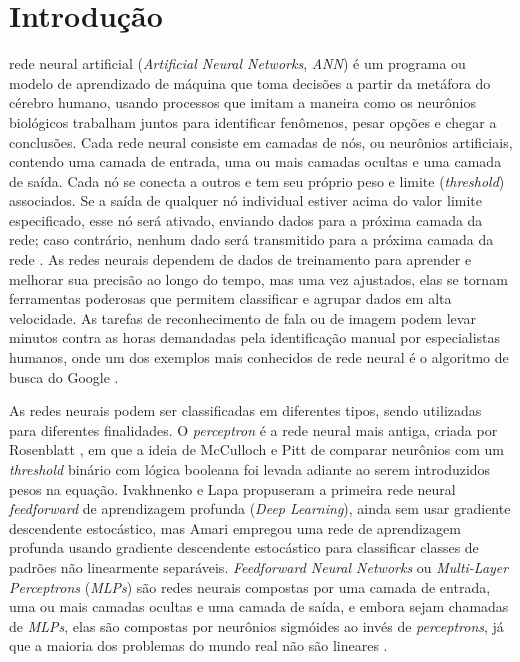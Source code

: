 \documentclass[journal]{IEEEtran}
\begin{document}
%
\IEEEpeerreviewmaketitle



\section{Introdução}
 rede neural artificial (\textit{Artificial Neural Networks}, \textit{ANN}) é um programa ou modelo de aprendizado de máquina que toma decisões a partir da metáfora do cérebro humano, usando processos que imitam a maneira como os neurônios biológicos trabalham juntos para identificar fenômenos, pesar opções e chegar a conclusões. Cada rede neural consiste em camadas de nós, ou neurônios artificiais, contendo uma camada de entrada, uma ou mais camadas ocultas e uma camada de saída. Cada nó se conecta a outros e tem seu próprio peso e limite (\textit{threshold}) associados. Se a saída de qualquer nó individual estiver acima do valor limite especificado, esse nó será ativado, enviando dados para a próxima camada da rede; caso contrário, nenhum dado será transmitido para a próxima camada da rede \cite{ibm}.
As redes neurais dependem de dados de treinamento para aprender e melhorar sua precisão ao longo do tempo, mas uma vez ajustados, elas se tornam ferramentas poderosas que permitem classificar e agrupar dados em alta velocidade. As tarefas de reconhecimento de fala ou de imagem podem levar minutos contra as horas demandadas pela identificação manual por especialistas humanos, onde um dos exemplos mais conhecidos de rede neural é o algoritmo de busca do Google \cite{ibm}.

As redes neurais podem ser classificadas em diferentes tipos, sendo utilizadas para diferentes finalidades. O \textit{perceptron} é a rede neural mais antiga, criada por Rosenblatt \cite{rosenblatt}, em que a ideia de McCulloch e Pitt \cite{mcculloch} de comparar neurônios com um \textit{threshold} binário com lógica booleana foi levada adiante ao serem introduzidos pesos na equação. Ivakhnenko e Lapa \cite{ivakhnenko} propuseram a primeira rede neural \textit{feedforward} de aprendizagem profunda (\textit{Deep Learning}), ainda sem usar gradiente descendente estocástico, mas Amari \cite{amari} empregou uma rede de aprendizagem profunda usando gradiente descendente estocástico para classificar classes de padrões não linearmente separáveis. \textit{Feedforward Neural Networks} ou \textit{Multi-Layer Perceptrons} (\textit{MLPs}) \cite{rumelhart} são redes neurais compostas por uma camada de entrada, uma ou mais camadas ocultas e uma camada de saída, e embora sejam chamadas de \textit{MLPs}, elas são compostas por neurônios sigmóides ao invés de \textit{perceptrons}, já que a maioria dos problemas do mundo real não são lineares \cite{ibm}.
\end{document}
